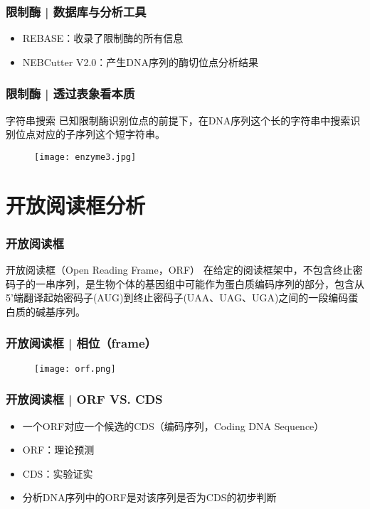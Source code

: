 \begin{frame}
  \frametitle{限制酶 | 数据库与分析工具}
  \begin{itemize}
    \item REBASE：收录了限制酶的所有信息
    \item NEBCutter V2.0：产生DNA序列的酶切位点分析结果
  \end{itemize}
\end{frame}

\begin{frame}
  \frametitle{限制酶 | 透过表象看本质}
  \begin{block}{字符串搜索}
    已知限制酶识别位点的前提下，在DNA序列这个长的字符串中搜索识别位点对应的子序列这个短字符串。
  \end{block}
  \begin{figure}
    \centering
    \texttt{[image: enzyme3.jpg]}
  \end{figure}
\end{frame}

\section{开放阅读框分析}
\begin{frame}
  \frametitle{开放阅读框}
  \begin{block}{开放阅读框（Open Reading Frame，ORF）}
    在给定的阅读框架中，不包含终止密码子的一串序列，是生物个体的基因组中可能作为蛋白质编码序列的部分，包含从5'端翻译起始密码子(AUG)到终止密码子(UAA、UAG、UGA)之间的一段编码蛋白质的碱基序列。
  \end{block}
\end{frame}

\begin{frame}
  \frametitle{开放阅读框 | 相位（frame）}
  \begin{figure}
    \centering
    \texttt{[image: orf.png]}
  \end{figure}
\end{frame}

\begin{frame}
  \frametitle{开放阅读框 | \alert{ORF VS. CDS}}
  \pause
  \begin{itemize}
    \item 一个ORF对应一个候选的CDS（编码序列，Coding DNA Sequence）
    \item ORF：理论预测
    \item CDS：实验证实
    \item 分析DNA序列中的ORF是对该序列是否为CDS的初步判断
  \end{itemize}
\end{frame}

